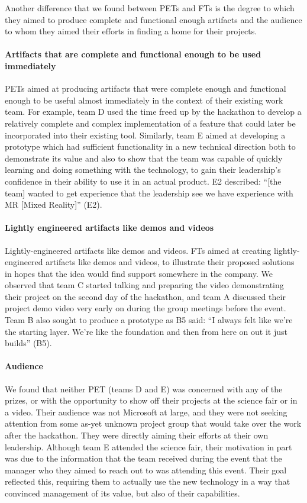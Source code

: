 \documentclass{hcij}
\begin{document}
Another difference that we found between PETs and FTs is the degree to which they aimed to produce complete and functional enough artifacts and the audience to whom they aimed their efforts in finding a home for their projects.

\paragraph{Artifacts that are complete and functional enough to be used immediately}
PETs aimed at producing artifacts that were complete enough and functional enough to be useful almost immediately in the context of their existing work team. For example, team D used the time freed up by the hackathon to develop a relatively complete and complex implementation of a feature that could later be incorporated into their existing tool. Similarly, team E aimed at developing a prototype which had sufficient functionality in a new technical direction both to demonstrate its value and also to show that the team was capable of quickly learning and doing something with the technology, to gain their leadership’s confidence in their ability to use it in an actual product. E2 described: “[the team] wanted to get experience that the leadership see we have experience with MR [Mixed Reality]” (E2).

\paragraph{Lightly engineered artifacts like demos and videos}
Lightly-engineered artifacts like demos and videos. FTs aimed at creating lightly-engineered artifacts like demos and videos, to illustrate their proposed solutions in hopes that the idea would find support somewhere in the company. We observed that team C started talking and preparing the video demonstrating their project on the second day of the hackathon, and team A discussed their project demo video very early on during the group meetings before the event. Team B also sought to produce a prototype as B5 said: “I always felt like we're the starting layer. We're like the foundation and then from here on out it just builds” (B5).

\paragraph{Audience}
We found that neither PET (teams D and E) was concerned with any of the prizes, or with the opportunity to show off their projects at the science fair or in a video. Their audience was not Microsoft at large, and they were not seeking attention from some as-yet unknown project group that would take over the work after the hackathon. They were directly aiming their efforts at their own leadership. Although team E attended the science fair, their motivation in part was due to the information that the team received during the event that the manager who they aimed to reach out to was attending this event. Their goal reflected this, requiring them to actually use the new technology in a way that convinced management of its value, but also of their capabilities.
\end{document}
